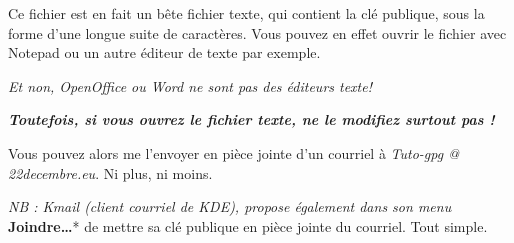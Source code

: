 Ce fichier est en fait un bête fichier texte, qui contient la clé
publique, sous la forme d'une longue suite de caractères. Vous pouvez en
effet ouvrir le fichier avec Notepad ou un autre éditeur de texte par
exemple.

\emph{Et non, OpenOffice ou Word ne sont pas des éditeurs texte!}

\textbf{\emph{Toutefois, si vous ouvrez le fichier texte, ne le modifiez
surtout pas !}}

Vous pouvez alors me l'envoyer en pièce jointe d'un courriel à
\emph{Tuto-gpg @ 22decembre.eu}. Ni plus, ni moins.

\emph{NB : Kmail (client courriel de KDE), propose également dans son menu }\textbf{Joindre\ldots{}}* de mettre sa clé publique en pièce
jointe du courriel. Tout simple.